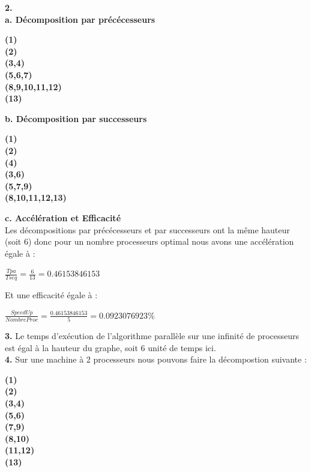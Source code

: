 \documentclass{article}
\begin{document}
\smallskip
\textbf{2.} \\
\textbf{a. D\'ecomposition par pr\'ec\'ecesseurs}
\begin{center}
\textbf{(1)}\\
\textbf{(2)}\\
\textbf{(3,4)}\\
\textbf{(5,6,7)}\\
\textbf{(8,9,10,11,12)}\\
\textbf{(13)}\\
\end{center}

\textbf{b. D\'ecomposition par successeurs}\\
\begin{center}
  \textbf{(1)}\\
  \textbf{(2)}\\
  \textbf{(4)}\\
  \textbf{(3,6)}\\
  \textbf{(5,7,9)}\\
  \textbf{(8,10,11,12,13)}\\
\end{center}

\textbf{c. Acc\'el\'eration et Efficacit\'e}\\
Les d\'ecompositions par pr\'ec\'ecesseurs et par successeurs ont la m\^eme hauteur (soit 6) donc pour un nombre processeurs optimal nous avons une acc\'el\'eration \'egale \`a :\\
\begin{center}
  $\frac{Tpa}{Tseq} = \frac{6}{13} = 0.46153846153$
\end{center}

Et une efficacit\'e \'egale \`a : \\
\begin{center}
  $\frac{SpeedUp}{NombreProc} = \frac{0.46153846153}{5} = 0.0923076923$\%
\end{center}

\smallskip
\textbf{3.} Le temps d'ex\'ecution de l'algorithme parall\`ele sur une infinit\'e de processeurs est \'egal \`a la hauteur du graphe, soit 6 unit\'e de temps ici.\\

\smallskip
\textbf{4.} Sur une machine \`a 2 processeurs nous pouvons faire la d\'ecompostion suivante :
\begin{center}
  \textbf{(1)}\\
  \textbf{(2)}\\
  \textbf{(3,4)}\\
  \textbf{(5,6)}\\
  \textbf{(7,9)}\\
  \textbf{(8,10)}\\
  \textbf{(11,12)}\\
  \textbf{(13)}\\
\end{center}
\end{document}
